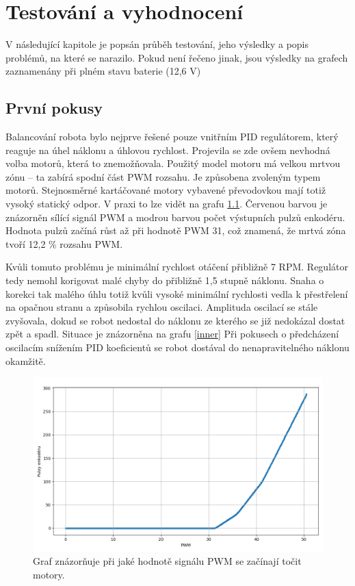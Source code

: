 \chapter{Testování a vyhodnocení}
\label{chap6}
V následující kapitole je popsán průběh testování, jeho výsledky a popis problémů, na které se narazilo. Pokud není řečeno jinak, jsou výsledky na grafech zaznamenány při plném stavu baterie (12,6 V)

\section{První pokusy}
Balancování robota bylo nejprve řešené pouze vnitřním PID regulátorem, který reaguje na úhel náklonu a úhlovou rychlost. Projevila se zde ovšem nevhodná volba motorů, která to znemožňovala. Použitý model motoru má velkou mrtvou zónu -- ta zabírá spodní část PWM rozsahu. Je způsobena zvoleným typem motorů. Stejnosměrné kartáčované motory vybavené převodovkou mají totiž vysoký statický odpor. V praxi to lze vidět na grafu \ref{deadzone}. Červenou barvou je znázorněn sílící signál PWM a modrou barvou počet výstupních pulzů enkodéru. Hodnota pulzů začíná růst až při hodnotě PWM 31, což znamená, že mrtvá zóna tvoří 12,2 \% rozsahu PWM.

Kvůli tomuto problému je minimální rychlost otáčení přibližně 7 RPM. Regulátor tedy nemohl korigovat malé chyby do přibližně 1,5 stupně náklonu. Snaha o korekci tak malého úhlu totiž kvůli vysoké minimální rychlosti vedla k přestřelení na opačnou stranu a způsobila rychlou oscilaci. Amplituda oscilací se stále zvyšovala, dokud se robot nedostal do náklonu ze kterého se již nedokázal dostat zpět a spadl. Situace je znázorněna na grafu \ref{inner} Při pokusech o předcházení oscilacím snížením PID koeficientů se robot dostával do nenapravitelného náklonu okamžitě.

\begin{figure}[H]
  \centering
  \includegraphics[width=1.\linewidth]{obrazky-figures/deadzone.png}%
  \caption{Graf znázorňuje při jaké hodnotě signálu PWM se začínají točit motory.}
  \label{deadzone}
\end{figure}

